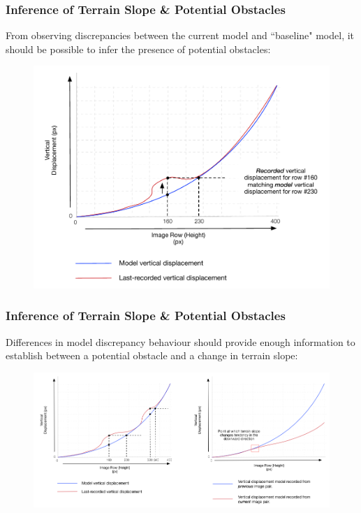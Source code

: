 \documentclass[10pt, compress]{beamer}
\begin{document}
\begin{frame}[fragile]
  \frametitle{Inference of Terrain Slope \& Potential Obstacles}

From observing discrepancies between the current model and ``baseline" model, it should be possible to infer the presence of potential obstacles: 

  \begin{figure}[ht!]
\centering
\includegraphics[scale=0.5]{obstacle_graph}
  \end{figure}
  
  
\end{frame}

\begin{frame}[fragile]
  \frametitle{Inference of Terrain Slope \& Potential Obstacles}

Differences in model discrepancy behaviour should provide enough information to establish between a potential obstacle and a change in terrain slope: 

  \begin{figure}[ht!]
\centering
\includegraphics[scale=0.32]{slope_vs_obstacle}
  \end{figure}
  
  
\end{frame}
\end{document}
